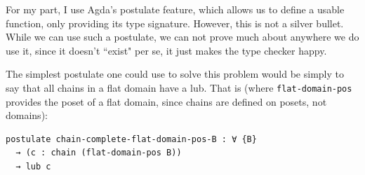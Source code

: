 \documentclass[12pt,a4paper,twoside,openright]{report}
\begin{document}
For my part, I use Agda's postulate feature, which allows us to define a usable function, only providing its type signature. However, this is not a silver bullet. While we can use such a postulate, we can not prove much about anywhere we do use it, since it doesn't ``exist" per se, it just makes the type checker happy. 

The simplest postulate one could use to solve this problem would be simply to say that all chains in a flat domain have a lub. That is (where \texttt{flat-domain-pos} provides the poset of a flat domain, since chains are defined on posets, not domains):
\begin{verbatim}
postulate chain-complete-flat-domain-pos-B : ∀ {B} 
  → (c : chain (flat-domain-pos B)) 
  → lub c
\end{verbatim}
\end{document}
